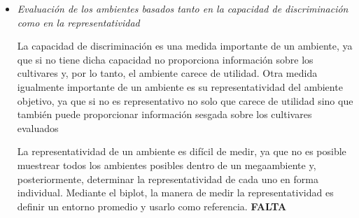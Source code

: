 \begin{itemize}[wide, nosep, labelindent = 0pt, topsep = 1ex, noitemsep,topsep=0pt]
\item \emph{Evaluación de los ambientes basados tanto en la capacidad de discriminación como en la representatividad}

La capacidad de discriminación es una medida importante de un ambiente, ya que si no tiene dicha capacidad no proporciona información sobre los cultivares y, por lo tanto, el ambiente carece de utilidad. Otra medida igualmente importante de un ambiente es su representatividad del ambiente objetivo, ya que si no es representativo no solo que carece de utilidad sino que también puede proporcionar información sesgada sobre los cultivares evaluados

La representatividad de un ambiente es difícil de medir, ya que no es posible muestrear todos los ambientes posibles dentro de un megaambiente y, posteriormente, determinar la representatividad de cada uno en forma individual. Mediante el biplot, la manera de medir la representatividad es definir un entorno promedio y usarlo como referencia. \textbf{FALTA}



\end{itemize}
